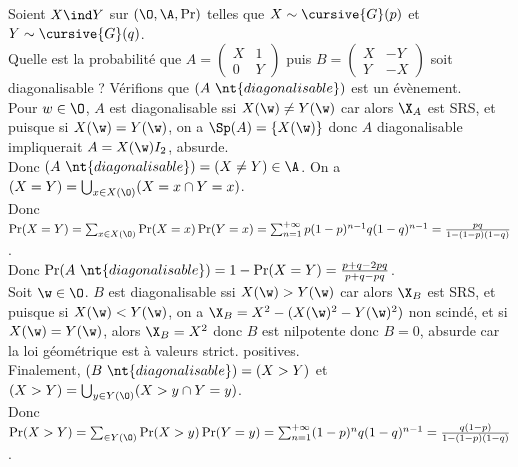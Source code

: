 \documentclass[11pt]{article}
\begin{document}
\begin{exercice}{}{}
    Soient $X\ind Y$ sur $(\O,\A,\Pr)$ telles que $X\sim\cursive{G}(p)$ et $Y\sim\cursive{G}(q)$.\\
    Quelle est la probabilité que $A=\begin{pmatrix}X&1\\0&Y\end{pmatrix}$ puis $B=\begin{pmatrix}X&-Y\\Y&-X\end{pmatrix}$ soit diagonalisable ?
    \tcblower
     Vérifions que $(A ~ \nt{diagonalisable})$ est un évènement.\\
    Pour $w\in\O$, $A$ est diagonalisable ssi $X(\w)\neq Y(\w)$ car alors $\X_A$ est SRS, et puisque si $X(\w)=Y(\w)$, on a $\Sp(A)=\{X(\w)\}$ donc $A$ diagonalisable impliquerait $A=X(\w)I_2$, absurde.\\
    Donc $(A~\nt{diagonalisable})=(X\neq Y)\in\A$. On a $(X=Y)=\bigcup_{x\in X(\O)}(X=x\cap Y=x)$.\\
    Donc $\Pr(X=Y)=\sum_{x\in X(\O)}\Pr(X=x)\Pr(Y=x)=\sum_{n=1}^{+\infty}p(1-p)^{n-1}q(1-q)^{n-1} = \frac{pq}{1-(1-p)(1-q)}$.\\
    Donc $\Pr(A~\nt{diagonalisable})=1-\Pr(X=Y)=\frac{p+q-2pq}{p+q-pq}$.\\
     Soit $\w\in\O$. $B$ est diagonalisable ssi $X(\w)>Y(\w)$ car alors $\X_B$ est SRS, et puisque si $X(\w)<Y(\w)$, on a $\X_B = X^2 - (X(\w)^2 - Y(\w)^2)$ non scindé, et si $X(\w)=Y(\w)$, alors $\X_B = X^2$ donc $B$ est nilpotente donc $B=0$, absurde car la loi géométrique est à valeurs strict. positives.\\
    Finalement, $(B~\nt{diagonalisable})=(X>Y)$ et $(X>Y)=\bigcup_{y\in Y(\O)}(X>y\cap Y=y)$.\\
    Donc $\Pr(X>Y)=\sum_{\in Y(\O)}\Pr(X>y)\Pr(Y=y)=\sum_{n=1}^{+\infty}(1-p)^nq(1-q)^{n-1}=\frac{q(1-p)}{1-(1-p)(1-q)}$. 
\end{exercice}

\vspace*{-0.8cm}
\end{document}

